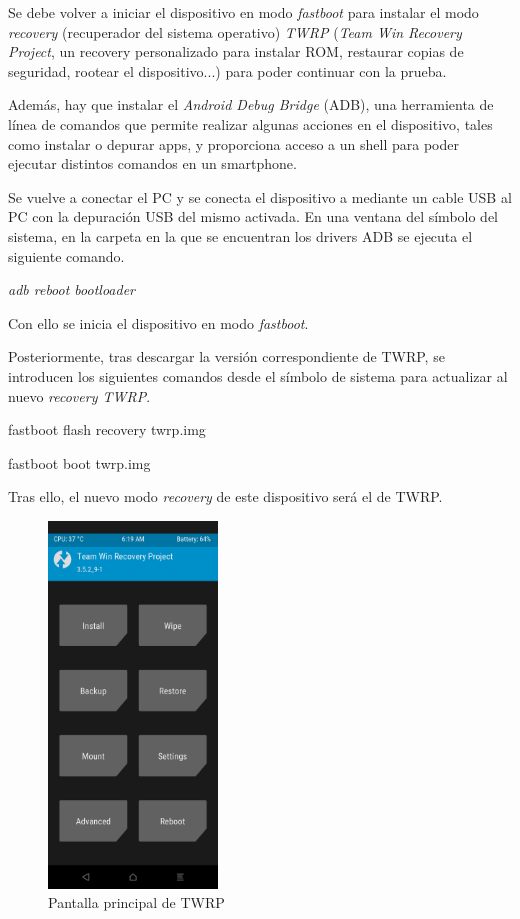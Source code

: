 \documentclass[12pt,a4paper,onecolumn,oneside]{report}
\begin{document}
Se debe volver a iniciar el dispositivo en modo \textit{fastboot} para instalar el modo \textit{recovery} (recuperador del sistema operativo) \textit{TWRP} (\textit{Team Win Recovery Project}, un recovery personalizado para instalar ROM, restaurar copias de seguridad, rootear el dispositivo...) para poder continuar con la prueba.

Además, hay que instalar el \textit{Android Debug Bridge} (ADB), una herramienta de línea de comandos que permite realizar algunas acciones en el dispositivo, tales como instalar o depurar apps, y proporciona acceso a un shell para poder ejecutar distintos comandos en un smartphone.

Se vuelve a conectar el PC y se conecta el dispositivo a mediante un cable USB al PC con la depuración USB del mismo activada. En una ventana del símbolo del sistema, en la carpeta en la que se encuentran los drivers ADB se ejecuta el siguiente comando.

\textit{adb reboot bootloader}

Con ello se inicia el dispositivo en modo \textit{fastboot}.

Posteriormente, tras descargar la versión correspondiente de TWRP, se introducen los siguientes comandos desde el símbolo de sistema para actualizar al nuevo \textit{recovery TWRP}.

fastboot flash recovery twrp.img

fastboot boot twrp.img

Tras ello, el nuevo modo \textit{recovery} de este dispositivo será el de TWRP.

\begin{figure}[H] 
\centering
  \includegraphics[width=0.4\textwidth]{figuras/root51.png}
  \caption[Pantalla principal de TWRP]{Pantalla principal de TWRP\\
  }
  \label{fig:root51}
\end{figure}
\end{document}

